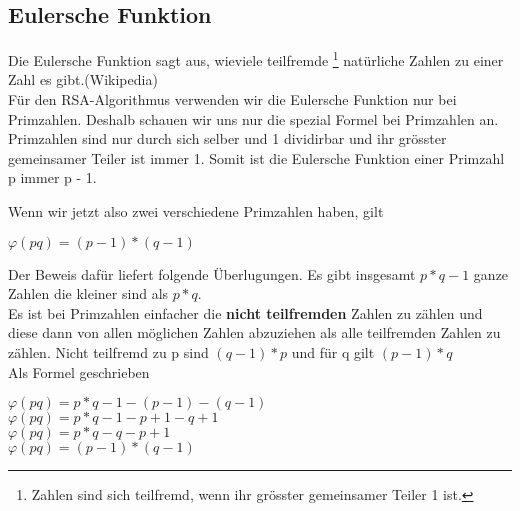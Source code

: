 \subsection{Eulersche Funktion}
Die Eulersche Funktion sagt aus, wieviele teilfremde \footnote{Zahlen sind sich teilfremd, wenn ihr grösster gemeinsamer Teiler 1 ist.} natürliche Zahlen zu einer Zahl es gibt.(Wikipedia)\\
Für den RSA-Algorithmus verwenden wir die Eulersche Funktion nur bei Primzahlen. Deshalb schauen wir uns nur die spezial Formel bei Primzahlen an.\\
Primzahlen sind nur durch sich selber und 1 dividirbar und ihr grösster gemeinsamer Teiler ist immer 1. Somit ist die Eulersche Funktion einer Primzahl p immer p - 1.
\begin{center}
\end{center}
Wenn wir jetzt also zwei verschiedene Primzahlen haben, gilt
\begin{center}
$ \varphi(pq) = (p - 1) * (q - 1) $
\end{center}
Der Beweis dafür liefert folgende Überlugungen. Es gibt insgesamt $ p * q -1 $ ganze Zahlen die kleiner sind als $ p * q $.\\
Es ist bei Primzahlen einfacher die \textbf{nicht teilfremden} Zahlen zu zählen und diese dann von allen möglichen Zahlen abzuziehen als alle teilfremden Zahlen zu zählen. Nicht teilfremd zu p sind $ (q - 1) * p $ und für q gilt $ (p - 1) * q $\\
Als Formel geschrieben
\begin{center}
$ \varphi(pq) = p * q -1 - (p - 1) - (q - 1) $ \\
$ \varphi(pq) = p * q -1 - p + 1 - q + 1 $ \\
$ \varphi(pq) = p * q -q - p + 1 $ \\
$ \varphi(pq) = (p -1) * (q - 1) $ 
\end{center}
